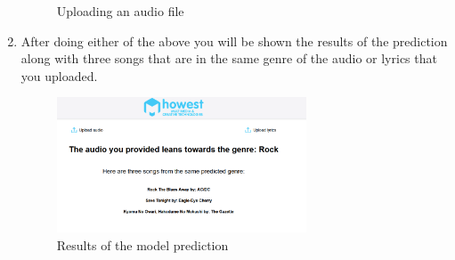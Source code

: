 \documentclass{article}
\begin{document}
\begin{enumerate}
\begin{figure}[H]
        \caption{Uploading an audio file}
    \end{figure}
    \item After doing either of the above you will be shown the results of the prediction along with three songs that are in the same genre of the audio or lyrics that you uploaded.
    \begin{figure}[H]
        \centering
        \includegraphics[width=0.7\textwidth]{audioprediction.PNG}
        \caption{Results of the model prediction}
    \end{figure}
\end{enumerate}
\end{document}
